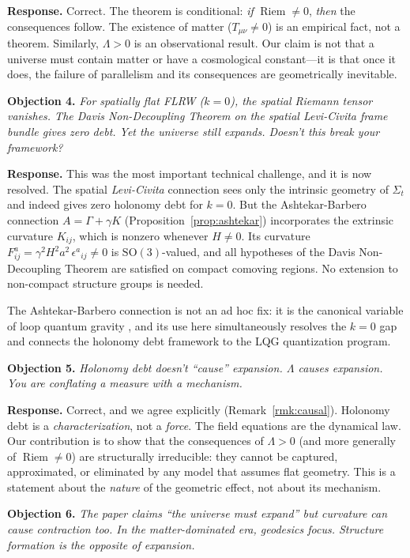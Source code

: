 \documentclass[12pt]{amsart}
\theoremstyle{definition}
\newcommand{\Riem}{\operatorname{Riem}}
\begin{document}
\textbf{Response.}  Correct.  The theorem is conditional: \emph{if} $\Riem \neq 0$, \emph{then} the consequences follow.  The existence of matter ($T_{\mu\nu} \neq 0$) is an empirical fact, not a theorem.  Similarly, $\Lambda > 0$ is an observational result.  Our claim is not that a universe must contain matter or have a cosmological constant---it is that once it does, the failure of parallelism and its consequences are geometrically inevitable.

\textbf{Objection 4.}  \emph{For spatially flat FLRW ($k = 0$), the spatial Riemann tensor vanishes.  The Davis Non-Decoupling Theorem on the spatial Levi-Civita frame bundle gives zero debt.  Yet the universe still expands.  Doesn't this break your framework?}

\textbf{Response.}  This was the most important technical challenge, and it is now resolved.  The spatial \emph{Levi-Civita} connection sees only the intrinsic geometry of $\Sigma_t$ and indeed gives zero holonomy debt for $k = 0$.  But the Ashtekar-Barbero connection $A = \Gamma + \gamma K$ (Proposition~\ref{prop:ashtekar}) incorporates the extrinsic curvature $K_{ij}$, which is nonzero whenever $H \neq 0$.  Its curvature $F^a_{ij} = \gamma^2 H^2 a^2\,\epsilon^a{}_{ij} \neq 0$ is $\mathrm{SO}(3)$-valued, and all hypotheses of the Davis Non-Decoupling Theorem are satisfied on compact comoving regions.  No extension to non-compact structure groups is needed.

The Ashtekar-Barbero connection is not an ad hoc fix: it is the canonical variable of loop quantum gravity \cite{ashtekar1986,barbero1995}, and its use here simultaneously resolves the $k = 0$ gap and connects the holonomy debt framework to the LQG quantization program.

\textbf{Objection 5.}  \emph{Holonomy debt doesn't ``cause'' expansion.  $\Lambda$ causes expansion.  You are conflating a measure with a mechanism.}

\textbf{Response.}  Correct, and we agree explicitly (Remark~\ref{rmk:causal}).  Holonomy debt is a \emph{characterization}, not a \emph{force}.  The field equations are the dynamical law.  Our contribution is to show that the consequences of $\Lambda > 0$ (and more generally of $\Riem \neq 0$) are structurally irreducible: they cannot be captured, approximated, or eliminated by any model that assumes flat geometry.  This is a statement about the \emph{nature} of the geometric effect, not about its mechanism.

\textbf{Objection 6.}  \emph{The paper claims ``the universe must expand'' but curvature can cause contraction too.  In the matter-dominated era, geodesics focus.  Structure formation is the opposite of expansion.}
\end{document}
